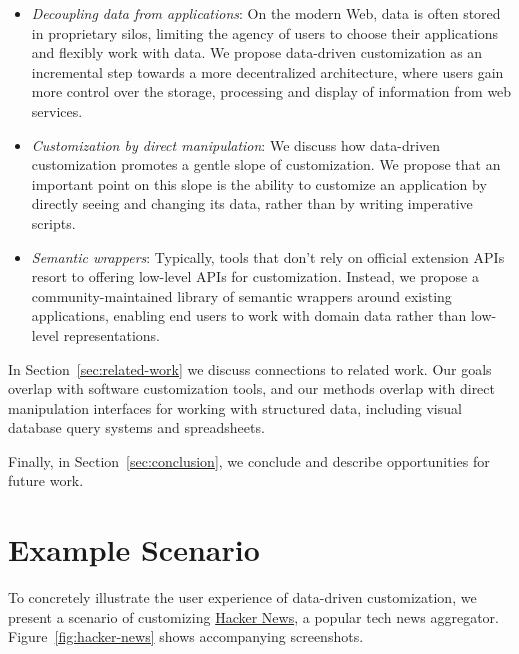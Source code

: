 \documentclass[sigplan,screen,10pt,anonymous,review]{acmart}
\providecommand{\tightlist}{%
  \setlength{\itemsep}{0pt}\setlength{\parskip}{0pt}}
\begin{document}
\begin{itemize}
\tightlist
\item
  \emph{Decoupling data from applications}: On the modern Web, data is
  often stored in proprietary silos, limiting the agency of users to
  choose their applications and flexibly work with data. We propose
  data-driven customization as an incremental step towards a more
  decentralized architecture, where users gain more control over the
  storage, processing and display of information from web services.
\item
  \emph{Customization by direct manipulation}: We discuss how
  data-driven customization promotes a gentle slope of customization. We
  propose that an important point on this slope is the ability to
  customize an application by directly seeing and changing its data,
  rather than by writing imperative scripts.
\item
  \emph{Semantic wrappers}: Typically, tools that don't rely on official
  extension APIs resort to offering low-level APIs for customization.
  Instead, we propose a community-maintained library of semantic
  wrappers around existing applications, enabling end users to work with
  domain data rather than low-level representations.
\end{itemize}

In Section~\ref{sec:related-work} we discuss connections to related
work. Our goals overlap with software customization tools, and our
methods overlap with direct manipulation interfaces for working with
structured data, including visual database query systems and
spreadsheets.

Finally, in Section~\ref{sec:conclusion}, we conclude and describe
opportunities for future work.

\hypertarget{sec:example}{%
\section{Example Scenario}\label{sec:example}}

To concretely illustrate the user experience of data-driven
customization, we present a scenario of customizing
\href{https://news.ycombinator.com/}{Hacker News}, a popular tech news
aggregator. Figure~\ref{fig:hacker-news} shows accompanying screenshots.
\end{document}
